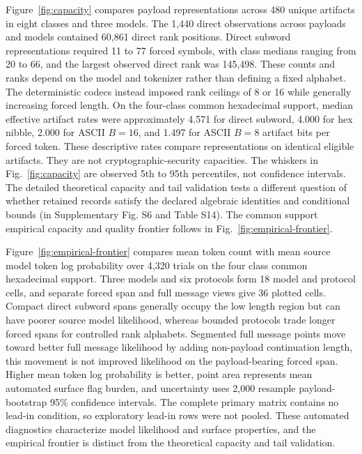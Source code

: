 \documentclass[fleqn,10pt]{wlscirep}
\begin{document}
Figure~\ref{fig:capacity} compares payload representations across 480 unique artifacts in eight classes and three models. The 1,440 direct observations across payloads and models contained 60,861 direct rank positions. Direct subword representations required 11 to 77 forced symbols, with class medians ranging from 20 to 66, and the largest observed direct rank was 145,498. These counts and ranks depend on the model and tokenizer rather than defining a fixed alphabet.
The deterministic codecs instead imposed rank ceilings of 8 or 16 while generally increasing forced length. On the four-class common hexadecimal support, median effective artifact rates were approximately 4.571 for direct subword, 4.000 for hex nibble, 2.000 for ASCII \(B=16\), and 1.497 for ASCII \(B=8\) artifact bits per forced token. These descriptive rates compare representations on identical eligible artifacts. They are not cryptographic-security capacities.
The whiskers in Fig.~\ref{fig:capacity} are observed 5th to 95th percentiles, not confidence intervals. The detailed theoretical capacity and tail validation tests a different question of whether retained records satisfy the declared algebraic identities and conditional bounds (in Supplementary Fig. S6 and Table S14). The common support empirical capacity and quality frontier follows in Fig.~\ref{fig:empirical-frontier}.



Figure~\ref{fig:empirical-frontier} compares mean token count with mean source model token log probability over 4,320 trials on the four class common hexadecimal support. Three models and six protocols form 18 model and protocol cells, and separate forced span and full message views give 36 plotted cells. Compact direct subword spans generally occupy the low length region but can have poorer source model likelihood, whereas bounded protocols trade longer forced spans for controlled rank alphabets. Segmented full message points move toward better full message likelihood by adding non-payload continuation length, this movement is not improved likelihood on the payload-bearing forced span. Higher mean token log probability is better, point area represents mean automated surface flag burden, and uncertainty uses 2,000 resample payload-bootstrap 95\% confidence intervals. The complete primary matrix contains no lead-in condition, so exploratory lead-in rows were not pooled. These automated diagnostics characterize model likelihood and surface properties, and the empirical frontier is distinct from the theoretical capacity and tail validation.
\end{document}
